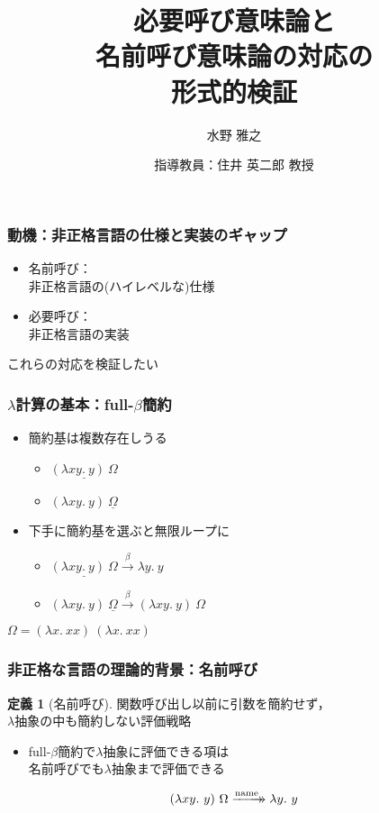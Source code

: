 \documentclass[dvipdfmx,cjk,xcolor=dvipsnames,envcountsect,notheorems,12pt]{beamer}
\title{必要呼び意味論と\\名前呼び意味論の対応の\\形式的検証}
\author{水野 雅之}
\institute[東北大学 住井・松田研]{情報科学研究科 情報基礎科学専攻\\住井・松田研究室}%
\date{指導教員：住井 英二郎 教授}
\theoremstyle{definition}
\newtheorem{definition}{定義}
\newcommand{\xtwoheadrightarrow}[2][]{%
  \xrightarrow[#1]{#2}\mathrel{\mkern-14mu}\rightarrow
}
\newcommand{\FULLBETA}{\xrightarrow{\beta}}
\newcommand{\RTCLOSCALLBYNAME}{\xtwoheadrightarrow{\mathrm{name}}}
\begin{document}
\frame[plain]{\titlepage}%

\begin{frame}
	\frametitle{動機：非正格言語の仕様と実装のギャップ}
	\begin{itemize}
		\item 名前呼び：\\非正格言語の(ハイレベルな)仕様
		\item 必要呼び：\\非正格言語の実装
	\end{itemize}
	\vfill
	\begin{center}
		\Large
		これらの対応を検証したい
	\end{center}
\end{frame}

\begin{frame}
	\frametitle{$\lambda$計算の基本：full-$\beta$簡約}
	\vspace{-\baselineskip}
	\begin{itemize}
		\item 簡約基は複数存在しうる
			\begin{itemize}
				\item $\underline{(\lambda xy.~y)~\Omega}$
			\end{itemize}
			\vfill
			\begin{itemize}
				\item $(\lambda xy.~y)~\underline{\Omega}$
			\end{itemize}
		\item 下手に簡約基を選ぶと無限ループに
			\begin{itemize}
				\item 
					$\underline{(\lambda xy.~y)~\Omega} \FULLBETA \lambda y.~y$
			\end{itemize}
			\vfill
			\begin{itemize}
				\item 
					$(\lambda xy.~y)~\underline{\Omega} \FULLBETA (\lambda xy.~y)~\Omega$
			\end{itemize}
	\end{itemize}
	\begin{flushright}
		\Large $\Omega=(\lambda x.~xx)~(\lambda x.~xx)$
	\end{flushright}
\end{frame}

\begin{frame}
	\frametitle{非正格な言語の理論的背景：名前呼び}
	\begin{definition}[名前呼び]
		\Large 関数呼び出し以前に引数を簡約せず，\\$\lambda$抽象の中も簡約しない評価戦略
	\end{definition}
	\begin{itemize}
		\item full-$\beta$簡約で$\lambda$抽象に評価できる項は\\名前呼びでも$\lambda$抽象まで評価できる\\
	\end{itemize}
	\Large \[(\lambda xy.~y)~\Omega \RTCLOSCALLBYNAME \lambda y.~y\]
\end{frame}
\end{document}
